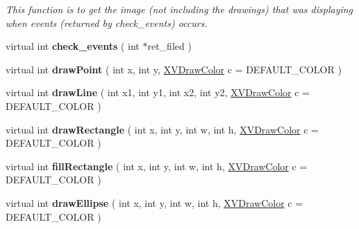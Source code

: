 \begin{CompactItemize}
\begin{CompactList}\small\item\em This function is to get the image (not including the drawings) that was displaying when events (returned by check\_\-events) occurs.\item\end{CompactList}\item 
\label{XVRemoteWindowX_a19}
\hypertarget{class_XVRemoteWindowX_a19}{
virtual int {\bf check\_\-events} ( int $\ast$ret\_\-filed )}

\item 
\label{XVRemoteWindowX_a20}
\hypertarget{class_XVRemoteWindowX_a20}{
virtual int {\bf draw\-Point} ( int x, int y, \hyperlink{class_XVDrawColor}{XVDraw\-Color} c = DEFAULT\_\-COLOR )}

\item 
\label{XVRemoteWindowX_a21}
\hypertarget{class_XVRemoteWindowX_a21}{
virtual int {\bf draw\-Line} ( int x1, int y1, int x2, int y2, \hyperlink{class_XVDrawColor}{XVDraw\-Color} c = DEFAULT\_\-COLOR )}

\item 
\label{XVRemoteWindowX_a22}
\hypertarget{class_XVRemoteWindowX_a22}{
virtual int {\bf draw\-Rectangle} ( int x, int y, int w, int h, \hyperlink{class_XVDrawColor}{XVDraw\-Color} c = DEFAULT\_\-COLOR )}

\item 
\label{XVRemoteWindowX_a23}
\hypertarget{class_XVRemoteWindowX_a23}{
virtual int {\bf fill\-Rectangle} ( int x, int y, int w, int h, \hyperlink{class_XVDrawColor}{XVDraw\-Color} c = DEFAULT\_\-COLOR )}

\item 
\label{XVRemoteWindowX_a24}
\hypertarget{class_XVRemoteWindowX_a24}{
virtual int {\bf draw\-Ellipse} ( int x, int y, int w, int h, \hyperlink{class_XVDrawColor}{XVDraw\-Color} c = DEFAULT\_\-COLOR )}


\end{CompactItemize}
